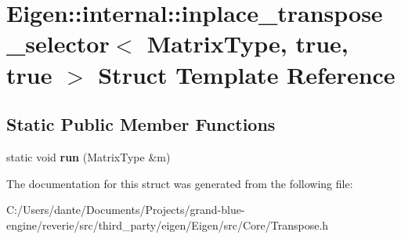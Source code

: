 \hypertarget{struct_eigen_1_1internal_1_1inplace__transpose__selector_3_01_matrix_type_00_01true_00_01true_01_4}{}\section{Eigen\+::internal\+::inplace\+\_\+transpose\+\_\+selector$<$ Matrix\+Type, true, true $>$ Struct Template Reference}
\label{struct_eigen_1_1internal_1_1inplace__transpose__selector_3_01_matrix_type_00_01true_00_01true_01_4}
\subsection*{Static Public Member Functions}
\begin{DoxyCompactItemize}
\item 
\mbox{\label{struct_eigen_1_1internal_1_1inplace__transpose__selector_3_01_matrix_type_00_01true_00_01true_01_4_ade80113166d3d27b8631ba4549269926}} 
static void {\bfseries run} (Matrix\+Type \&m)
\end{DoxyCompactItemize}


The documentation for this struct was generated from the following file\+:\begin{DoxyCompactItemize}
\item 
C\+:/\+Users/dante/\+Documents/\+Projects/grand-\/blue-\/engine/reverie/src/third\+\_\+party/eigen/\+Eigen/src/\+Core/Transpose.\+h\end{DoxyCompactItemize}
